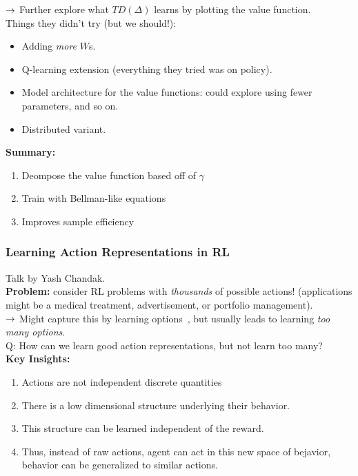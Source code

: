 $\rightarrow$ Further explore what $TD(\Delta)$ learns by plotting the value function. \\

Things they didn't try (but we should!):
\begin{itemize}
    \item Adding {\it more} $W$s.
    \item Q-learning extension (everything they tried was on policy).
    \item Model architecture for the value functions: could explore using fewer parameters, and so on.
    \item Distributed variant.
\end{itemize}

{\bf Summary:}
\begin{enumerate}
    \item Deompose the value function based off of $\gamma$
    \item Train with Bellman-like equations
    \item Improves sample efficiency
\end{enumerate}

\spacerule
\subsubsection{Learning Action Representations in RL}

Talk by Yash Chandak. \\

{\bf Problem:} consider RL problems with {\it thousands} of possible actions! (applications might be a medical treatment, advertisement, or portfolio management). \\

$\rightarrow$ Might capture this by learning options~\cite{sutton1999between}, but usually leads to learning {\it too many options}. \\

Q: How can we learn good action representations, but not learn too many? \\

{\bf Key Insights:}
\begin{enumerate}
    \item Actions are not independent discrete quantities
    \item There is a low dimensional structure underlying their behavior.
    \item This structure can be learned independent of the reward.
    
    \item Thus, instead of raw actions, agent can act in this new space of bejavior, behavior can be generalized to similar actions. 
\end{enumerate}

